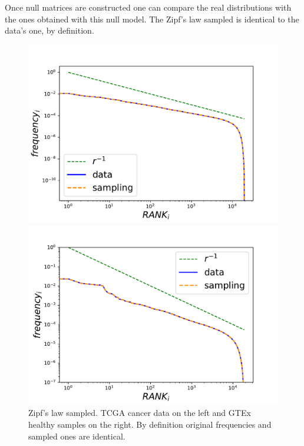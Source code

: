 Once null matrices are constructed one can compare the real distributions with the ones obtained with this null model.
The Zipf's law sampled is identical to the data's one, by definition.
\begin{figure}[htb!]
\begin{minipage}{0.5\textwidth}
    \centering
    \includegraphics[width=0.95\linewidth]{pictures/structure/tcga/globalzipf_null.pdf}
\end{minipage}
\hspace{2mm}
\begin{minipage}{0.5\textwidth}
    \centering
    \includegraphics[width=0.95\linewidth]{pictures/structure/gtex/globalzipf_null.pdf}
\end{minipage}
\caption{Zipf's law sampled. TCGA cancer data on the left and GTEx healthy samples on the right. By definition original frequencies and sampled ones are identical.}
\label{fig:structure/globalzipf_null}
\end{figure}
